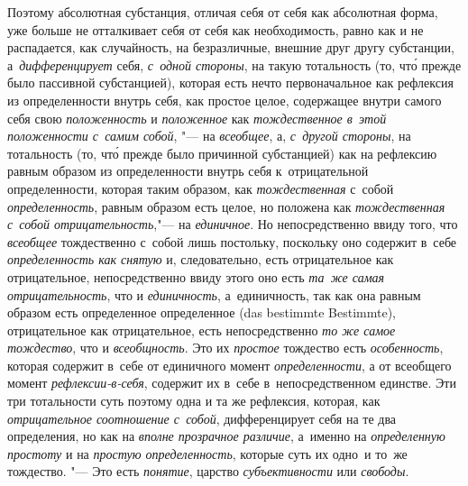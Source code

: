 Поэтому абсолютная субстанция, отличая себя от себя как абсолютная форма, уже
больше не отталкивает себя от себя как необходимость, равно как и не
распадается, как случайность, на безразличные, внешние друг другу субстанции,
а~{\em дифференцирует} себя, {\em с~одной стороны}, на такую тотальность
(то, чт\'{о} прежде было пассивной субстанцией), которая есть нечто
первоначальное как рефлексия из определенности внутрь себя, как простое целое,
содержащее внутри самого себя свою {\em положенность} и {\em положенное} как
{\em тождественное в~этой положенности с~самим собой}, "--- на {\em всеобщее},
а, {\em с~другой стороны}, на тотальность (то, чт\'{о} прежде было причинной
субстанцией) как на рефлексию равным образом из определенности внутрь себя
к~отрицательной определенности, которая таким образом, как {\em тождественная}
с~собой {\em определенность}, равным образом есть целое, но положена как
{\em тождественная с~собой отрицательность},"--- на {\em единичное}. Но
непосредственно ввиду того, что {\em всеобщее} тождественно с~собой лишь
постольку, поскольку оно содержит в~себе {\em определенность как снятую} и,
следовательно, есть отрицательное как отрицательное, непосредственно ввиду
этого оно есть {\em та~же самая отрицательность}, что и {\em единичность},
а~единичность, так как она равным образом есть определенное определенное
(das bestimmte Bestimmte), отрицательное как отрицательное, есть
непосредственно {\em то же самое тождество}, что и {\em всеобщность}. Это их
{\em простое} тождество есть {\em особенность}, которая содержит в~себе от
единичного момент {\em определенности}, а от всеобщего момент
{\em рефлексии-в-себя}, содержит их в~себе в~непосредственном единстве.
Эти три тотальности суть поэтому одна и та же рефлексия, которая, как
{\em отрицательное соотношение с~собой}, дифференцирует себя на те два
определения, но как на {\em вполне прозрачное различие}, а~именно на
{\em определенную простоту} и на {\em простую определенность}, которые
суть их одно~и то~же тождество. "--- Это есть {\em понятие}, царство
{\em субъективности} или {\em свободы}.

\bigskip
